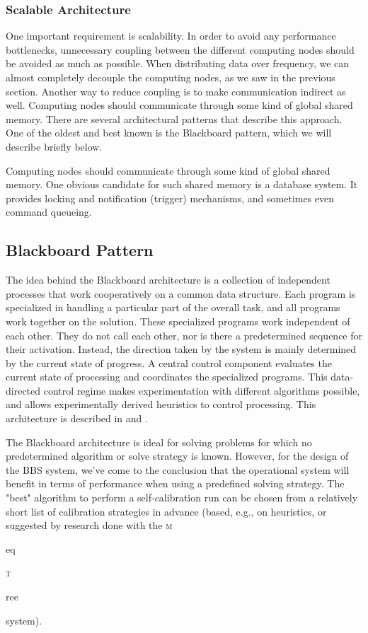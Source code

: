 \documentclass[10pt]{lofar}
\newcommand{\meqtree}{\textsc{m}\begin{footnotesize}eq\end{footnotesize}\textsc{t}\begin{footnotesize}ree\end{footnotesize}\xspace}
\begin{document}
\subsubsection{Scalable Architecture}
\label{subsubsec:scalable-architecture}
One important requirement is scalability. In order to avoid any performance
bottlenecks, unnecessary coupling between the different computing nodes should
be avoided as much as possible. When distributing data over frequency, we can
almost completely decouple the computing nodes, as we saw in the previous
section. Another way to reduce coupling is to make communication indirect as
well. Computing nodes should communicate through some kind of global shared
memory. There are several architectural patterns that describe this approach. 
One of the oldest and best known is the Blackboard pattern, which we will 
describe briefly below.

Computing nodes should communicate through some kind of global shared
memory. One obvious candidate for such shared memory is a database system. It
provides locking and notification (trigger) mechanisms, and sometimes even
command queueing.

\subsection{Blackboard Pattern}
\label{subsec:blackboard}
The idea behind the Blackboard architecture is a collection of independent
processes that work cooperatively on a common data structure. Each program is
specialized in handling a particular part of the overall task, and all
programs work together on the solution. These specialized programs work
independent of each other. They do not call each other, nor is there a
predetermined sequence for their activation. Instead, the direction taken by
the system is mainly determined by the current state of progress. A central
control component evaluates the current state of processing and coordinates
the specialized programs. This data-directed control regime makes
experimentation with different algorithms possible, and allows experimentally
derived heuristics to control processing. This architecture is described in
\cite{Buschmann1996} and
\cite{LOFAR-ASTRON-SDD-002}.

The Blackboard architecture is ideal for solving problems for which no
predetermined algorithm or solve strategy is known. However, for the design of
the BBS system, we've come to the conclusion that the operational system will
benefit in terms of performance when using a predefined solving strategy. The
"best" algorithm to perform a self-calibration run can be chosen from a
relatively short list of calibration strategies in advance (based, e.g., on
heuristics, or suggested by research done with the \meqtree system).
\end{document}

